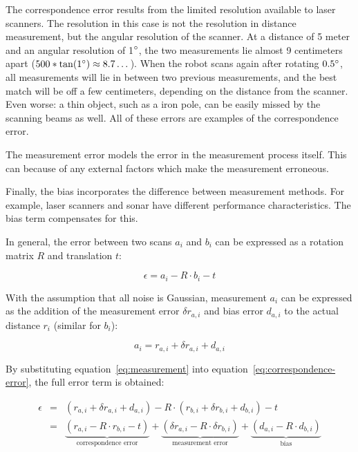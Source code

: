 The correspondence error results from the limited resolution available to laser scanners. The resolution in this case is not the resolution in distance measurement, but the angular resolution of the scanner. At a distance of 5 meter and an angular resolution of 1$\degree$, the two measurements lie almost 9 centimeters apart ($500 * \tan(1\degree) \approx 8.7\dots$). When the robot scans again after rotating $0.5\degree$, all measurements will lie in between two previous measurements, and the best match will be off a few centimeters, depending on the distance from the scanner. Even worse: a thin object, such as a iron pole, can be easily missed by the scanning beams as well. All of these errors are examples of the correspondence error.

The measurement error models the error in the measurement process itself. This can because of any external factors which make the measurement erroneous. 

Finally, the bias incorporates the difference between measurement methods. For example, laser scanners and sonar have different performance characteristics. The bias term compensates for this.

In general, the error between two scans $a_i$ and $b_i$ can be expressed as a rotation matrix $R$ and translation $t$:

\begin{equation}
\label{eq:correspondence-error}
\epsilon = a_i - R \cdot b_i - t
\end{equation}

With the assumption that all noise is Gaussian, measurement $a_i$ can be expressed as the addition of the measurement error $\delta r_{a, i}$ and bias error $d_{a, i}$  to the actual distance $r_i$ (similar for $b_i$):

\begin{equation}
\label{eq:measurement}
a_i = r_{a,i} + \delta r_{a, i} + d_{a, i}
\end{equation}

By substituting equation~\ref{eq:measurement} into equation~\ref{eq:correspondence-error}, the full error term is obtained:

\begin{eqnarray}
\label{eq:wsm}
\epsilon &=& (r_{a,i} + \delta r_{a, i} + d_{a, i}) - R \cdot (r_{b,i} + \delta r_{b, i} + d_{b, i}) - t
			 \nonumber \\
         &=& \underbrace{(r_{a, i} - R \cdot r_{b, i} - t)}_\text{correspondence error} + 
             \underbrace{(\delta r_{a, i} - R \cdot \delta r_{b, i})}_\text{measurement error} + 
             \underbrace{(d_{a, i} - R \cdot d_{b, i})}_\text{bias}
\end{eqnarray}


